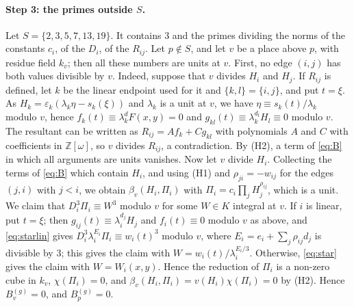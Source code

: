 \documentclass[11pt]{article}
\newcommand{\Z}{\mathbb{Z}}
\begin{document}
\paragraph{Step 3: the primes outside $S$.} Let $S=\{2,3,5,7,13,19\}$. It contains $3$ and the primes dividing the norms of the constants $c_i$, of the $D_i$, of the $R_{ij}$. Let $p\notin S$, and let $v$ be a place above $p$, with residue field $k_v$; then all these numbers are units at $v$. First, no edge $(i,j)$ has both values divisible by $v$. Indeed, suppose that $v$ divides $H_i$ and $H_j$. If $R_{ij}$ is defined, let $k$ be the linear endpoint used for it and $\{k,l\}=\{i,j\}$, and put $t=\xi$. As $H_k=\varepsilon_k(\lambda_k\eta-s_k(\xi))$ and $\lambda_k$ is a unit at $v$, we have $\eta\equiv s_k(t)/\lambda_k$ modulo $v$, hence $f_k(t)\equiv\lambda_k^dF(x,y)=0$ and $g_{kl}(t)\equiv\lambda_k^{d_l}H_l\equiv0$ modulo $v$. The resultant can be written as $R_{ij}=Af_k+Cg_{kl}$ with polynomials $A$ and $C$ with coefficients in $\Z[\omega]$, so $v$ divides $R_{ij}$, a contradiction. By (H2), a term of \eqref{eq:B} in which all arguments are units vanishes. Now let $v$ divide $H_i$. Collecting the terms of \eqref{eq:B} which contain $H_i$, and using (H1) and $\rho_{ji}=-w_{ij}$ for the edges $(j,i)$ with $j<i$, we obtain $\beta_v(H_i,\Pi_i)$ with $\Pi_i=c_i\prod_jH_j^{\rho_{ij}}$, which is a unit. We claim that $D_i^3\Pi_i\equiv W^3$ modulo $v$ for some $W\in K$ integral at $v$. If $i$ is linear, put $t=\xi$; then $g_{ij}(t)\equiv\lambda_i^{d_j}H_j$ and $f_i(t)\equiv0$ modulo $v$ as above, and \eqref{eq:starlin} gives $D_i^3\lambda_i^{E_i}\Pi_i\equiv w_i(t)^3$ modulo $v$, where $E_i=e_i+\sum_j\rho_{ij}d_j$ is divisible by $3$; this gives the claim with $W=w_i(t)/\lambda_i^{E_i/3}$. Otherwise, \eqref{eq:star} gives the claim with $W=W_i(x,y)$. Hence the reduction of $\Pi_i$ is a non-zero cube in $k_v$, $\chi(\Pi_i)=0$, and $\beta_v(H_i,\Pi_i)=v(H_i)\chi(\Pi_i)=0$ by (H2). Hence $B^{(g)}_v=0$, and $B^{(g)}_p=0$.
\end{document}
